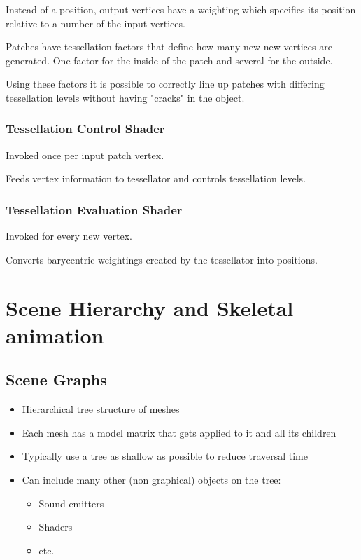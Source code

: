 \documentclass[a4paper]{article}
\begin{document}
Instead of a position, output vertices have a weighting which specifies its
position relative to a number of the input vertices.

Patches have tessellation factors that define how many new new vertices are
generated. One factor for the inside of the patch and several for the outside.

Using these factors it is possible to correctly line up patches with differing
tessellation levels without having "cracks" in the object.

\subsubsection{Tessellation Control Shader}

Invoked once per input patch vertex.

Feeds vertex information to tessellator and controls tessellation levels.

\subsubsection{Tessellation Evaluation Shader}

Invoked for every new vertex.

Converts barycentric weightings created by the tessellator into positions.

\section{Scene Hierarchy and Skeletal animation}

\subsection{Scene Graphs}

\begin{itemize}
  \item Hierarchical tree structure of meshes
  \item Each mesh has a model matrix that gets applied to it and all its
        children
  \item Typically use a tree as shallow as possible to reduce traversal time
  \item Can include many other (non graphical) objects on the tree:
    \begin{itemize}
      \item Sound emitters
      \item Shaders
      \item etc.
    \end{itemize}
\end{itemize}
\end{document}
